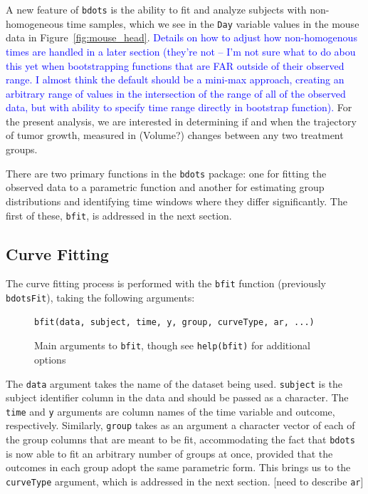 \documentclass{article}
\providecommand{\cn}[1]{\textcolor{blue}{#1}}
\newcommand{\xt}{\texttt}%
\begin{document}
A new feature of \xt{bdots} is the ability to fit and analyze subjects with non-homogeneous time samples, which we see in the \xt{Day} variable values in the mouse data in Figure~\ref{fig:mouse_head}. \cn{Details on how to adjust how non-homogenous times are handled in a later section (they're not -- I'm not sure what to do abou this yet when bootstrapping functions that are FAR outside of their observed range. I almost think the default should be a mini-max approach, creating an arbitrary range of values in the intersection of the range of all of the observed data, but with ability to specify time range directly in bootstrap function).} For the present analysis, we are interested in determining if and when the trajectory of tumor growth, measured in (Volume?) changes between any two treatment groups.

There are two primary functions in the \xt{bdots} package: one for fitting the observed data to a parametric function and another for estimating group distributions and identifying time windows where they differ significantly. The first of these, \xt{bfit}, is addressed in the next section.


\subsection{Curve Fitting}

The curve fitting process is performed with the \texttt{bfit} function (previously \texttt{bdotsFit}), taking the following arguments:


\begin{figure}[h!]
\centering
\begin{BVerbatim}
bfit(data, subject, time, y, group, curveType, ar, ...)
\end{BVerbatim}
\caption{Main arguments to \xt{bfit}, though see \xt{help(bfit)} for additional options}
\end{figure}



The \xt{data} argument takes the name of the dataset being used. \xt{subject} is the subject identifier column in the data and should be passed as a character.  The \xt{time} and \xt{y} arguments are column names of the time variable and outcome, respectively. Similarly, \xt{group} takes as an argument a character vector of each of the group columns that are meant to be fit, accommodating the fact that \xt{bdots} is now able to fit an arbitrary number of groups at once, provided that the outcomes in each group adopt the same parametric form. This brings us to the \xt{curveType} argument, which is addressed in the next section. [need to describe \xt{ar}]
\end{document}
